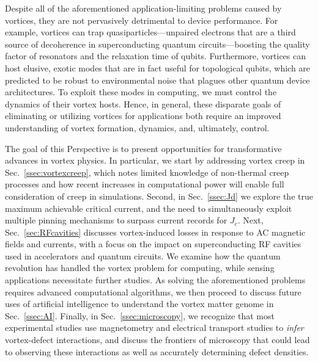 \documentclass[%
 aip,
 amsmath,amssymb,
 reprint,%
floatfix]{revtex4-1}
\newcommand{\Jc}{J_{c}}
\begin{document}
Despite all of the aforementioned application-limiting problems caused by vortices, they are not pervasively detrimental to device performance. For example, vortices can trap quasiparticles---unpaired electrons that are a third source of decoherence in superconducting quantum circuits---boosting the quality factor of resonators\cite{PhysRevLett.113.117002} and the relaxation time of qubits\cite{Wang2014}.  Furthermore, vortices can host elusive, exotic modes that are in fact useful for topological qubits, which are predicted to be robust to environmental noise that plagues other quantum device architectures. To exploit these modes in computing, we must control the dynamics of their vortex hosts.  Hence, in general, these disparate goals of eliminating or utilizing vortices for applications both require an improved understanding of vortex formation, dynamics, and, ultimately, control. 


The goal of this Perspective is to present opportunities for transformative advances in vortex physics. In particular, we start by addressing vortex creep in Sec.~\ref{ssec:vortexcreep},  which notes limited knowledge of non-thermal creep processes and how recent increases in computational power will enable full consideration of creep in simulations. Second, in Sec.~\ref{ssec:Jd} we explore the true maximum achievable critical current, and the need to simultaneously exploit multiple pinning mechanisms to surpass current records for $\Jc$.  Next, Sec.~\ref{sec:RFcavities} discusses vortex-induced losses in response to AC magnetic fields and currents, with a focus on the impact on superconducting RF cavities used in accelerators and quantum circuits. We examine how the quantum revolution has handled the vortex problem for computing, while sensing applications necessitate further studies. As solving the aforementioned problems requires advanced computational algorithms, we then proceed to discuss future uses of artificial intelligence to understand the vortex matter genome in Sec.~\ref{ssec:AI}.  Finally, in Sec.~\ref{ssec:microscopy}, we recognize that most experimental studies use magnetometry and electrical transport studies to \emph{infer} vortex-defect interactions, and discuss the frontiers of microscopy that could lead to observing these interactions as well as accurately determining defect densities.
\end{document}
